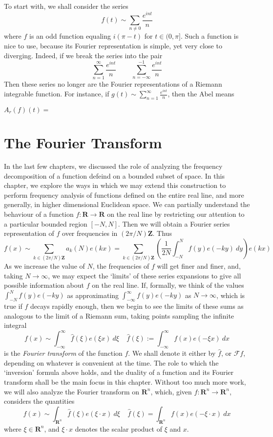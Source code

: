 To start with, we shall consider the series
%
\[ f(t) \sim \sum_{n \neq 0} \frac{e^{int}}{n} \]
%
where $f$ is an odd function equaling $i(\pi - t)$ for $t \in (0,\pi]$. Such a function is nice to use, because its Fourier representation is simple, yet very close to diverging. Indeed, if we break the series into the pair
%
\[ \sum_{n = 1}^\infty  \frac{e^{int}}{n}\ \ \ \ \ \ \ \ \ \ \sum_{n = -\infty}^{-1} \frac{e^{int}}{n} \]
%
Then these series no longer are the Fourier representations of a Riemann integrable function. For instance, if $g(t) \sim \sum_{n = 1}^\infty \frac{e^{int}}{n}$, then the Abel means

$A_r(f)(t) = $


\chapter{The Fourier Transform}

In the last few chapters, we discussed the role of analyzing the frequency decomposition of a function defeind on a bounded subset of space. In this chapter, we explore the ways in which we may extend this construction to perform frequency analysis of functions defined on the entire real line, and more generally, in higher dimensional Euclidean space. We can partially understand the behaviour of a function $f: \mathbf{R} \to \mathbf{R}$ on the real line by restricting our attention to a particular bounded region $[-N,N]$. Then we will obtain a Fourier series representation of $f$ over frequencies in $(2 \pi / N) \mathbf{Z}$. Thus
%
\[ f(x) \sim \sum_{k \in (2 \pi / N) \mathbf{Z}} a_k(N) e(kx) = \sum_{k \in (2 \pi / N) \mathbf{Z}} \left( \frac{1}{2N} \int_{-N}^N f(y) e(-ky)\ dy \right) e(kx) \]
%
As we increase the value of $N$, the frequencies of $f$ will get finer and finer, and, taking $N \to \infty$, we may expect the `limits' of these series expansions to give all possible information about $f$ on the real line. If, formally, we think of the values $\int_{-N}^N f(y) e(-ky)$ as approximating $\int_{-\infty}^\infty f(y) e(-ky)$ as $N \to \infty$, which is true if $f$ decays rapidly enough, then we begin to see the limits of these sums as analogous to the limit of a Riemann sum, taking points sampling the infinite integral
%
\[ f(x) \sim \int_{-\infty}^\infty \widehat{f}(\xi) e(\xi x)\ d\xi\ \ \ \ \ \widehat{f}(\xi) := \int_{-\infty}^\infty f(x) e(- \xi x)\ dx \]
%
is the {\it Fourier transform} of the function $f$. We shall denote it either by $\widehat{f}$, or $\mathcal{F} f$, depending on whatever is convenient at the time. The role to which the `inversion' formula above holds, and the duality of a function and its Fourier transform shall be the main focus in this chapter. Without too much more work, we will also analyze the Fourier transform on $\mathbf{R}^n$, which, given $f: \mathbf{R}^n \to \mathbf{R}^n$, considers the quantities
%
\[ f(x) \sim \int_{\mathbf{R}^n} \widehat{f}(\xi) e(\xi \cdot x)\ d\xi\ \ \ \ \ \widehat{f}(\xi) = \int_{\mathbf{R}^n} f(x) e(- \xi \cdot x)\ dx \]
%
where $\xi \in \mathbf{R}^n$, and $\xi \cdot x$ denotes the scalar product of $\xi$ and $x$.

